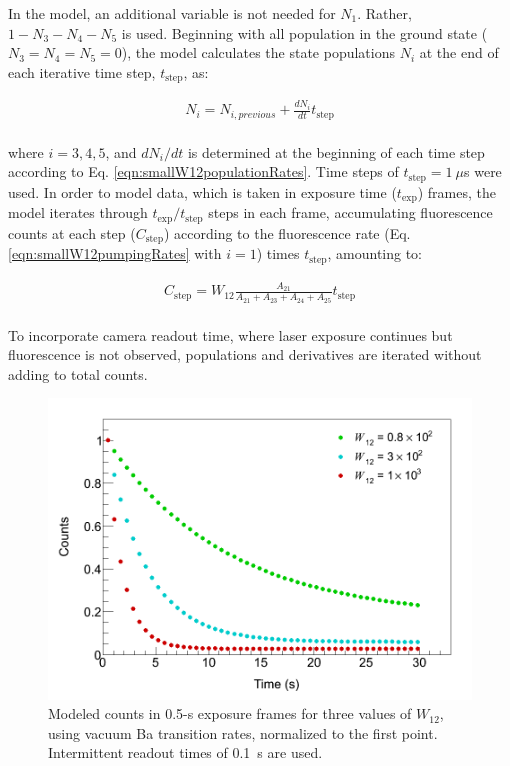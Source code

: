 \noindent
In the model, an additional variable is not needed for $N_{1}$.  Rather, $1 - N_{3} - N_{4} - N_{5}$ is used.  Beginning with all population in the ground state ($N_{3} = N_{4} = N_{5} = 0$), the model calculates the state populations $N_{i}$ at the end of each iterative time step, $t_{\text{step}}$, as:

\begin{equation}
\begin{aligned}
N_{i} = N_{i, previous} + \frac{dN_i}{dt}t_{\text{step}} \\
\end{aligned}
\label{eqn:smallW12populations}
\end{equation}

\noindent
where $i = 3,4,5$, and $dN_i/dt$ is determined at the beginning of each time step according to Eq. \ref{eqn:smallW12populationRates}.  Time steps of $t_{\text{step}} = 1~\mu$s were used.  In order to model data, which is taken in exposure time ($t_{\text{exp}}$) frames, the model iterates through $t_{\text{exp}}/t_{\text{step}}$ steps in each frame, accumulating fluorescence counts at each step ($C_{\text{step}}$) according to the fluorescence rate (Eq. \ref{eqn:smallW12pumpingRates} with $i = 1$) times $t_{\text{step}}$, amounting to:

\begin{equation}
\begin{aligned}
C_{\text{step}} = W_{12}\frac{A_{21}}{A_{21} + A_{23} + A_{24} + A_{25}}t_{\text{step}} \\
\end{aligned}
\label{eqn:smallW12counts}
\end{equation}

\noindent
To incorporate camera readout time, where laser exposure continues but fluorescence is not observed, populations and derivatives are iterated without adding to total counts.

\begin{figure} %
        \centering
                \includegraphics[width=.7\textwidth]{figures/thesis_modelExamples.png}
                \caption{Modeled counts in 0.5-s exposure frames for three values of $W_{12}$, using vacuum Ba transition rates, normalized to the first point.  Intermittent readout times of 0.1~s are used. }
\label{fig:modelExample}
\end{figure}

